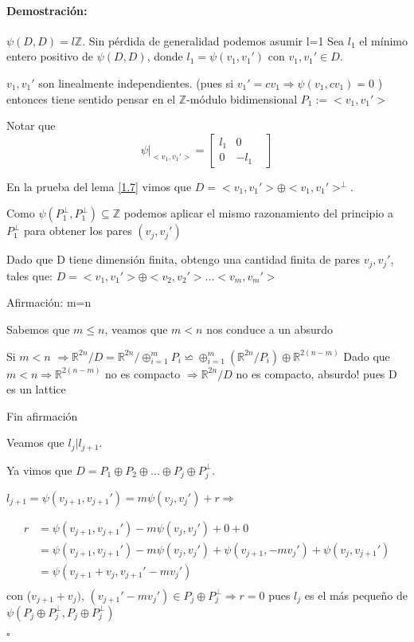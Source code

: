 \documentclass[12pt]{article}
\newenvironment{proof}{\paragraph{Demostración:}}{\hfill$\square$}
\begin{document}
\begin{proof}
$\psi(D,D)  = l \mathbb{Z}$. Sin pérdida de generalidad podemos asumir l=1
Sea $l_1$ el mínimo entero positivo de $\psi(D,D)$, donde $l_1=\psi(v_1,v_1')$ con $v_1,v_1' \in D$. 

$v_1,v_1'$ son linealmente independientes. (pues si $v_1'=c v_1 \Rightarrow \psi(v_1,c v_1)=0$ ) entonces tiene sentido
pensar en el $\mathbb{Z}$-módulo bidimensional $P_1:=<v_1,v_1'>$

Notar que $$
\psi|_{<v_1,v_1'>} = \begin{bmatrix}
                              l_1 & 0 &\\
                              0 & -l_1 &
                             \end{bmatrix}
$$

En la prueba del lema \ref{1.7} vimos que $D=<v_1,v_1'> \oplus <v_1,v_1'>^\bot$.

Como $\psi(P_1^\bot,P_1^\bot) \subseteq \mathbb{Z}$ podemos aplicar el mismo razonamiento del principio a $P_1^\bot$ 
para obtener los pares $(v_j,v_j')$

Dado que D tiene dimensión finita, obtengo una cantidad finita de pares $v_j,v_j'$, tales que:
$D=<v_1,v_1'>\oplus<v_2,v_2'>...<v_m,v_m'>$

Afirmación: m=n

Sabemos que $m\leq n$, veamos que $m<n$ nos conduce a un absurdo

Si $m<n$ $\Rightarrow \mathbb{R}^{2n}/D=\mathbb{R}^{2n}/\oplus_{i=1}^m P_i \backsimeq \oplus_{i=1}^m (\mathbb{R}^{2n}/P_i) \oplus \mathbb{R}^{2(n-m)} $\newline
Dado que $m<n \Rightarrow  \mathbb{R}^{2(n-m)}$ no es compacto $\Rightarrow \mathbb{R}^{2n}/D$ no es compacto, absurdo! pues D es un lattice

Fin afirmación
\newline


Veamos que $l_j|l_{j+1}$.

Ya vimos que $D= P_1\oplus P_2 \oplus...\oplus P_j \oplus P_j^\bot$.

$l_{j+1}=\psi(v_{j+1},v_{j+1}')=m \psi(v_j,v_j') +r \Rightarrow$ 

$$\begin{aligned}
r&=\psi(v_{j+1},v_{j+1}')-m \psi(v_j,v_j') + 0 + 0\\
&=\psi(v_{j+1},v_{j+1}')-m \psi(v_j,v_j') +  \psi(v_{j+1},-mv_j') + \psi(v_j,v_{j+1}')\\
&=\psi(v_{j+1} + v_j, v_{j+1}'-m v_j') \\
\end{aligned}$$ 
con ($v_{j+1} + v_j) $, $(v_{j+1}'-m v_j') \in P_j \oplus P_j^\bot \Rightarrow
r=0$ pues $l_j$ es el más pequeño de $\psi(P_j \oplus P_j^\bot, P_j \oplus P_j^\bot)$
\newline


\end{proof}
\end{document}
